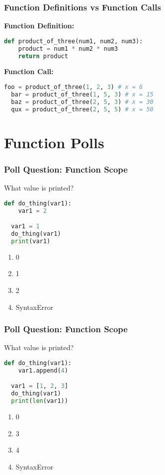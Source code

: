 \documentclass{beamer}
\begin{document}
%
%
\begin{frame}[fragile]
  \frametitle{Function Definitions vs Function Calls}
  \textbf{Function Definition:}
  \begin{lstlisting}[language=Python, autogobble]
  def product_of_three(num1, num2, num3):
    product = num1 * num2 * num3
    return product
  \end{lstlisting}
  \pause
  \vfill
  \textbf{Function Call:}
  \begin{lstlisting}[language=Python, autogobble]
  foo = product_of_three(1, 2, 3) # x = 6
  bar = product_of_three(1, 5, 3) # x = 15
  baz = product_of_three(2, 5, 3) # x = 30
  qux = product_of_three(2, 5, 5) # x = 50
  \end{lstlisting}
\end{frame}

\section{Function Polls}

%
%
\begin{frame}[fragile]
  \frametitle{Poll Question: Function Scope}
  What value is printed?
  \begin{lstlisting}[language=Python, autogobble]
  def do_thing(var1):
    var1 = 2

  var1 = 1
  do_thing(var1)
  print(var1)
  \end{lstlisting}
  \vfill
  \begin{enumerate}[A]
    \item 0
    \item 1 
    \item 2
    \item SyntaxError
  \end{enumerate}
\end{frame}


%
%
\begin{frame}[fragile]
  \frametitle{Poll Question: Function Scope}
  What value is printed?
  \begin{lstlisting}[language=Python, autogobble]
  def do_thing(var1):
    var1.append(4)

  var1 = [1, 2, 3]
  do_thing(var1)
  print(len(var1))
  \end{lstlisting}
  \vfill
  \begin{enumerate}[A]
    \item 0
    \item 3
    \item 4 
    \item SyntaxError
  \end{enumerate}
\end{frame}
\end{document}
